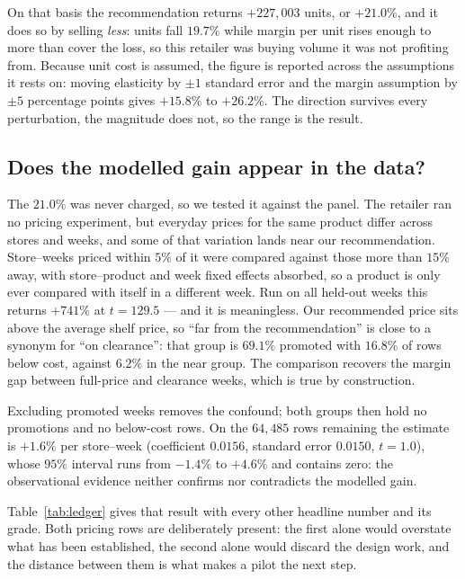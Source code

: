\documentclass[conference,a4paper]{IEEEtran}
\begin{document}
On that basis the recommendation returns $+227{,}003$ units, or $+21.0\%$, and it
does so by selling \emph{less}: units fall $19.7\%$ while margin per unit rises
enough to more than cover the loss, so this retailer was buying volume it was not
profiting from. Because unit cost is assumed, the figure is reported across the
assumptions it rests on: moving elasticity by $\pm 1$ standard error and the
margin assumption by $\pm 5$ percentage points gives $+15.8\%$ to $+26.2\%$. The
direction survives every perturbation, the magnitude does not, so the range is the
result.

\subsection{Does the modelled gain appear in the data?}
The $21.0\%$ was never charged, so we tested it against the panel. The retailer
ran no pricing experiment, but everyday prices for the same product differ across
stores and weeks, and some of that variation lands near our recommendation.
Store--weeks priced within $5\%$ of it were compared against those more than
$15\%$ away, with store--product and week fixed effects absorbed, so a product is
only ever compared with itself in a different week. Run on all held-out weeks this
returns $+741\%$ at $t=129.5$ --- and it is meaningless. Our recommended price
sits above the average shelf price, so ``far from the recommendation'' is close to
a synonym for ``on clearance'': that group
is $69.1\%$ promoted with $16.8\%$ of rows below cost, against $6.2\%$ in the near
group. The comparison recovers the margin gap between full-price and clearance
weeks, which is true by construction.

Excluding promoted weeks removes the confound; both groups then hold no
promotions and no below-cost rows. On the $64{,}485$ rows remaining the estimate is
$+1.6\%$ per store--week (coefficient $0.0156$, standard error $0.0150$, $t=1.0$),
whose $95\%$ interval runs from $-1.4\%$ to $+4.6\%$ and contains zero: the
observational evidence neither confirms nor contradicts the modelled gain.

Table~\ref{tab:ledger} gives that result with every other headline number and its
grade. Both pricing rows are deliberately present: the first alone would overstate
what has been established, the second alone would discard the design work, and the
distance between them is what makes a pilot the next step.
\end{document}

